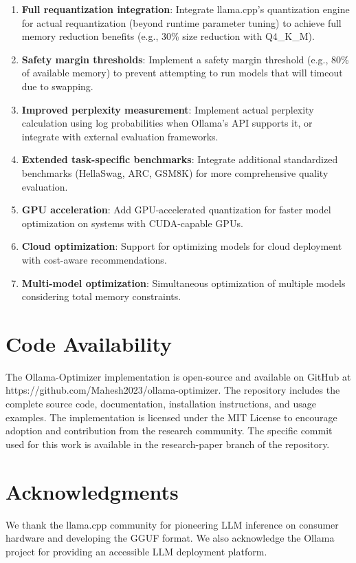 \documentclass[journal]{IEEEtran}
\begin{document}
\begin{enumerate}
    \item \textbf{Full requantization integration}: Integrate llama.cpp's quantization engine for actual requantization (beyond runtime parameter tuning) to achieve full memory reduction benefits (e.g., 30\% size reduction with Q4\_K\_M).
    \item \textbf{Safety margin thresholds}: Implement a safety margin threshold (e.g., 80\% of available memory) to prevent attempting to run models that will timeout due to swapping.
    \item \textbf{Improved perplexity measurement}: Implement actual perplexity calculation using log probabilities when Ollama's API supports it, or integrate with external evaluation frameworks.
    \item \textbf{Extended task-specific benchmarks}: Integrate additional standardized benchmarks (HellaSwag, ARC, GSM8K) for more comprehensive quality evaluation.
    \item \textbf{GPU acceleration}: Add GPU-accelerated quantization for faster model optimization on systems with CUDA-capable GPUs.
    \item \textbf{Cloud optimization}: Support for optimizing models for cloud deployment with cost-aware recommendations.
    \item \textbf{Multi-model optimization}: Simultaneous optimization of multiple models considering total memory constraints.
\end{enumerate}

\section*{Code Availability}

The Ollama-Optimizer implementation is open-source and available on GitHub at https://github.com/Mahesh2023/ollama-optimizer. The repository includes the complete source code, documentation, installation instructions, and usage examples. The implementation is licensed under the MIT License to encourage adoption and contribution from the research community. The specific commit used for this work is available in the research-paper branch of the repository.

\section*{Acknowledgments}

We thank the llama.cpp community for pioneering LLM inference on consumer hardware and developing the GGUF format. We also acknowledge the Ollama project for providing an accessible LLM deployment platform.
\end{document}

